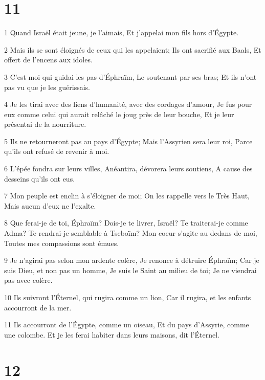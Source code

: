 \chapter{11}

\par 1 Quand Israël était jeune, je l'aimais, Et j'appelai mon fils hors d'Égypte.
\par 2 Mais ils se sont éloignés de ceux qui les appelaient; Ils ont sacrifié aux Baals, Et offert de l'encens aux idoles.
\par 3 C'est moi qui guidai les pas d'Éphraïm, Le soutenant par ses bras; Et ils n'ont pas vu que je les guérissais.
\par 4 Je les tirai avec des liens d'humanité, avec des cordages d'amour, Je fus pour eux comme celui qui aurait relâché le joug près de leur bouche, Et je leur présentai de la nourriture.
\par 5 Ils ne retourneront pas au pays d'Égypte; Mais l'Assyrien sera leur roi, Parce qu'ils ont refusé de revenir à moi.
\par 6 L'épée fondra sur leurs villes, Anéantira, dévorera leurs soutiens, A cause des desseins qu'ils ont eus.
\par 7 Mon peuple est enclin à s'éloigner de moi; On les rappelle vers le Très Haut, Mais aucun d'eux ne l'exalte.
\par 8 Que ferai-je de toi, Éphraïm? Dois-je te livrer, Israël? Te traiterai-je comme Adma? Te rendrai-je semblable à Tseboïm? Mon coeur s'agite au dedans de moi, Toutes mes compassions sont émues.
\par 9 Je n'agirai pas selon mon ardente colère, Je renonce à détruire Éphraïm; Car je suis Dieu, et non pas un homme, Je suis le Saint au milieu de toi; Je ne viendrai pas avec colère.
\par 10 Ils suivront l'Éternel, qui rugira comme un lion, Car il rugira, et les enfants accourront de la mer.
\par 11 Ils accourront de l'Égypte, comme un oiseau, Et du pays d'Assyrie, comme une colombe. Et je les ferai habiter dans leurs maisons, dit l'Éternel.

\chapter{12}


